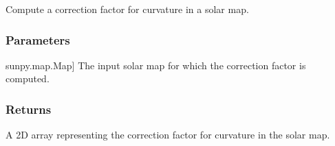 \documentclass[letterpaper,10pt,english]{sphinxmanual}
\begin{document}

\begin{fulllineitems}
\label{\detokenize{pycatch/utils/ch_mapping:pycatch.utils.ch_mapping.curve_corr}}
\pysigstartsignatures
{}
\pysigstopsignatures
\sphinxAtStartPar
Compute a correction factor for curvature in a solar map.


\subsubsection{Parameters}
\label{\detokenize{pycatch/utils/ch_mapping:id11}}\begin{description}
\sphinxlineitem{map}{[}sunpy.map.Map{]}
\sphinxAtStartPar
The input solar map for which the correction factor is computed.

\end{description}


\subsubsection{Returns}
\label{\detokenize{pycatch/utils/ch_mapping:id12}}\begin{description}
\sphinxAtStartPar
A 2D array representing the correction factor for curvature in the solar map.

\end{description}

\end{fulllineitems}

\end{document}

